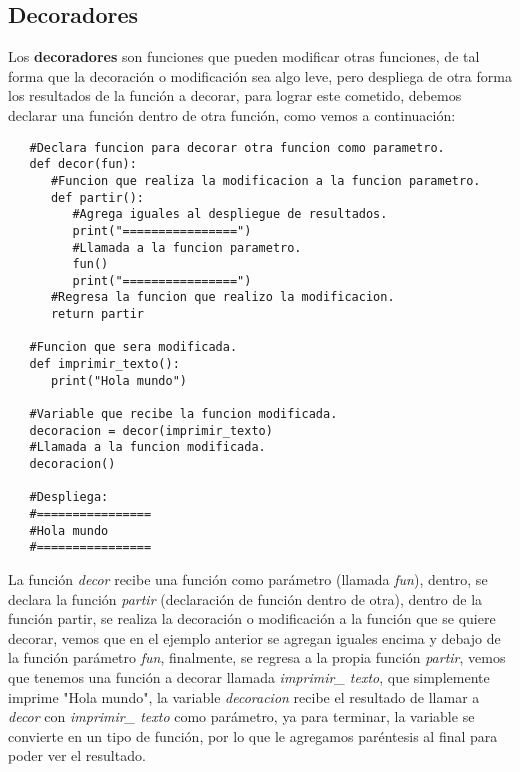 \subsection{Decoradores}
\hspace{0.55cm}Los \textbf{decoradores} son funciones que pueden modificar otras funciones, de tal forma que la decoración o modificación sea algo leve, pero despliega de otra forma los resultados de la función a decorar, para lograr este cometido, debemos declarar una función dentro de otra función, como vemos a continuación:
\begin{lstlisting}
   #Declara funcion para decorar otra funcion como parametro.
   def decor(fun):
      #Funcion que realiza la modificacion a la funcion parametro.
      def partir():
         #Agrega iguales al despliegue de resultados.
         print("================")
         #Llamada a la funcion parametro.
         fun()
         print("================")
      #Regresa la funcion que realizo la modificacion.
      return partir
      
   #Funcion que sera modificada.
   def imprimir_texto():
      print("Hola mundo")
   
   #Variable que recibe la funcion modificada.
   decoracion = decor(imprimir_texto)
   #Llamada a la funcion modificada.
   decoracion()
   
   #Despliega:
   #================
   #Hola mundo
   #================
\end{lstlisting}

La función \textit{decor} recibe una función como parámetro (llamada \textit{fun}), dentro, se declara la función \textit{partir} (declaración de función dentro de otra), dentro de la función partir, se realiza la decoración o modificación a la función que se quiere decorar, vemos que en el ejemplo anterior se agregan iguales encima y debajo de la función parámetro \textit{fun}, finalmente, se regresa a la propia función \textit{partir}, vemos que tenemos una función a decorar llamada \textit{imprimir\_ texto}, que simplemente imprime "Hola mundo", la variable \textit{decoracion} recibe el resultado de llamar a \textit{decor} con \textit{imprimir\_ texto} como parámetro, ya para terminar, la variable se convierte en un tipo de función, por lo que le agregamos paréntesis al final para poder ver el resultado.

